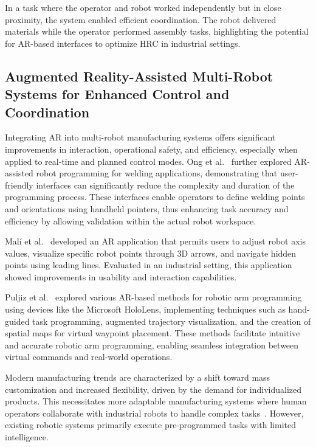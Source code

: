 In a task where the operator and robot worked independently but in close proximity, the system enabled efficient coordination. The robot delivered materials while the operator performed assembly tasks, highlighting the potential for \ac{AR}-based interfaces to optimize \ac{HRC} in industrial settings.

\subsection{Augmented Reality-Assisted Multi-Robot Systems for Enhanced Control and Coordination}

Integrating \ac{AR} into multi-robot manufacturing systems offers significant improvements in interaction, operational safety, and efficiency, especially when applied to real-time and planned control modes. Ong et al.~\cite{ong2020} further explored \ac{AR}-assisted robot programming for welding applications, demonstrating that user-friendly interfaces can significantly reduce the complexity and duration of the programming process. These interfaces enable operators to define welding points and orientations using handheld pointers, thus enhancing task accuracy and efficiency by allowing validation within the actual robot workspace.

Malí et al.~\cite{7819154} developed an \ac{AR} application that permits users to adjust robot axis values, visualize specific robot points through 3D arrows, and navigate hidden points using leading lines. Evaluated in an industrial setting, this application showed improvements in usability and interaction capabilities.

Puljiz et al.~\cite{puljiz2019conceptsendtoendaugmentedreality,puljiz2} explored various \ac{AR}-based methods for robotic arm programming using devices like the Microsoft HoloLens, implementing techniques such as hand-guided task programming, augmented trajectory visualization, and the creation of spatial maps for virtual waypoint placement. These methods facilitate intuitive and accurate robotic arm programming, enabling seamless integration between virtual commands and real-world operations.

Modern manufacturing trends are characterized by a shift toward mass customization and increased flexibility, driven by the demand for individualized products. This necessitates more adaptable manufacturing systems where human operators collaborate with industrial robots to handle complex tasks~\cite{1-ar-dt,2-ar-dt,3-ar-dt}. However, existing robotic systems primarily execute pre-programmed tasks with limited intelligence.

